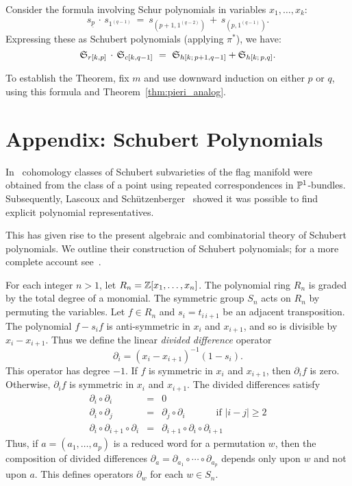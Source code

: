 Consider the formula involving Schur polynomials
in variables $x_1,\ldots, x_k$:
$$
s_{\underline{p}}\, \cdot \, s_{1^{(q-1)}} \   = \  
s_{(p{+}1,1^{(q-2)})} \, + \, s_{(p,1^{(q-1)})}.
$$
Expressing these as Schubert polynomials (applying $\pi^*$), we have:
$$
{\frak S}_{r[k,p]}\, \cdot\, {\frak S}_{c[k,q{-}1]}
\   =\   {\frak S}_{h[k;\,p{+}1,q{-}1]}  +
{\frak S}_{h[k;\,p,q]}.
$$

To establish the Theorem, fix $m$ and use downward induction  
on either $p$ or $q$, 
using this formula and Theorem~\ref{thm:pieri_analog}.
\QED




\section*{Appendix: Schubert Polynomials}

In~\cite{BGG,Demazure} cohomology classes of Schubert subvarieties of 
the flag manifold were obtained from the class of a point using repeated 
correspondences in ${\Bbb P}^1$-bundles.
Subsequently, Lascoux and 
Sch\"utzenberger~\cite{Lascoux_Schutzenberger_polynomes_schubert} 
showed it was possible to find explicit polynomial representatives.

This has given rise to the present algebraic and combinatorial 
theory of Schubert polynomials.
We outline their construction of Schubert polynomials; for a 
more complete 
account see~\cite{Macdonald_schubert}.


For each integer $n>1$, let $R_n = {\Bbb Z}[x_1,\ldots,x_n]$.
The polynomial ring $R_n$ is graded by the total degree of a monomial.
The symmetric group $S_n$ acts on $R_n$ by permuting the variables.
Let $f\in R_n$  and  $s_i = t_{i\,i{+}1}$ be an adjacent 
transposition.
The polynomial
$f - s_i f$ is anti-symmetric in $x_i$ and $x_{i+1}$,
and so is 
divisible by $x_i - x_{i+1}$.
Thus we define the linear {\em divided difference} operator 
$$
\partial_i = (x_i-x_{i+1})^{-1} (1 - s_i).
$$
This operator has degree $-1$. 
If $f$ is symmetric in $x_i$ and $x_{i+1}$, then $\partial_i f$ is zero.
Otherwise, $\partial_i f$ is symmetric in $x_i$ and $x_{i+1}$.
The divided differences satisfy
\begin{eqnarray*}
\partial_i\circ \partial_i & = & 0 \\
\partial_i \circ\partial_j &=& \partial_j \circ \partial_i \ \ \ 
\ \ \ \ \ \ \ \ \ \ \mbox{ if } |i-j|\geq 2\\
\partial_i\circ\partial_{i+1}\circ\partial_i & = &
\partial_{i+1}\circ\partial_i\circ\partial_{i+1}
\end{eqnarray*}
Thus, if $a = (a_1,\ldots,a_p)$ is a reduced word for a permutation
$w$, then the composition of divided differences 
$\partial_a = \partial_{a_1}\circ\cdots\circ\partial_{a_p}$
depends only upon $w$ and not upon $a$.  
This defines operators $\partial_{w}$ for each $w\in S_n$.

